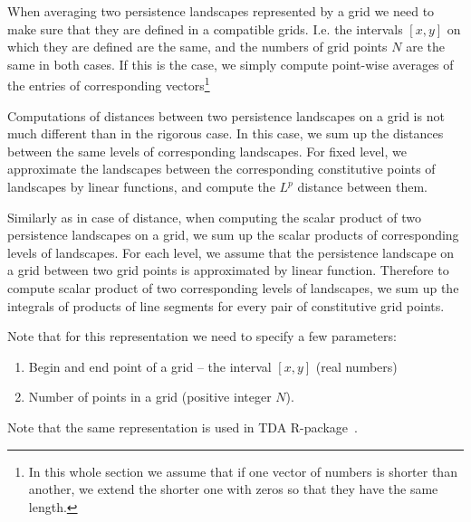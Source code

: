 \documentclass[11pt]{article}
\begin{document}
When averaging two persistence landscapes represented by a grid we need to make sure that they are defined in a compatible grids. I.e. the intervals $[x,y]$ on which they are defined are the same, and the numbers of grid points $N$ are the same in both cases. If this is the case, we simply compute point-wise averages of the entries of corresponding vectors\footnote{In this whole section we assume that if one vector of numbers is shorter than another, we extend the shorter one with zeros so that they have the same length.}

Computations of distances between two persistence landscapes on a grid is not much different than in the rigorous case. In this case, we sum up the distances between the same levels of corresponding landscapes. For fixed level, we approximate the landscapes between the corresponding constitutive points of landscapes by linear functions, and compute the $L^p$ distance between them.

Similarly as in case of distance, when computing the scalar product of two persistence landscapes on a grid, we sum up the scalar products of corresponding levels of landscapes. For each level, we assume that the persistence landscape on a grid between two grid points is approximated by linear function. Therefore to compute scalar product of two corresponding levels of landscapes, we sum up the integrals of products of line segments for every pair of constitutive grid points. 

Note that for this representation we need to specify a few parameters:
\begin{enumerate}
\item Begin and end point of a grid -- the interval $[x,y]$ (real numbers)

\item Number of points in a grid (positive integer $N$).
\end{enumerate}

Note that the same representation is used in TDA R-package~\cite{tda}.
\end{document}
